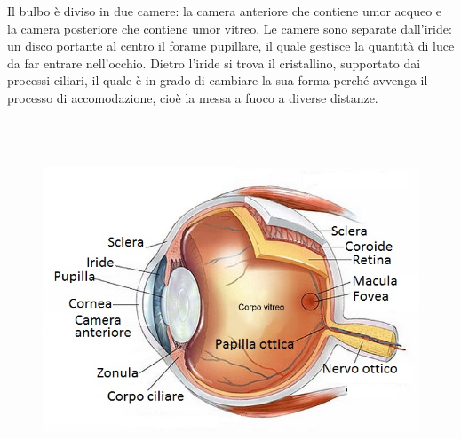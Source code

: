 Il bulbo è diviso in due camere: la camera anteriore che contiene umor acqueo e la camera posteriore che contiene umor vitreo. Le camere sono separate dall’iride: un disco portante al centro il forame pupillare, il quale gestisce la quantità di luce da far entrare nell’occhio. Dietro l’iride si trova il cristallino, supportato dai processi ciliari, il quale è in grado di cambiare la sua forma perché avvenga il processo di accomodazione, cioè la messa a fuoco a diverse distanze.

\\\


\begin{figure}[h!]
\centering
\begin{minipage}{.5\textwidth}
  \centering
  \includegraphics[scale=1.0]{source/immagini/anatomia_occhio.jpg}
  \label{fig:test1}
\end{minipage}%
\begin{minipage}{.5\textwidth}
  \centering

\end{minipage}
\end{figure}
